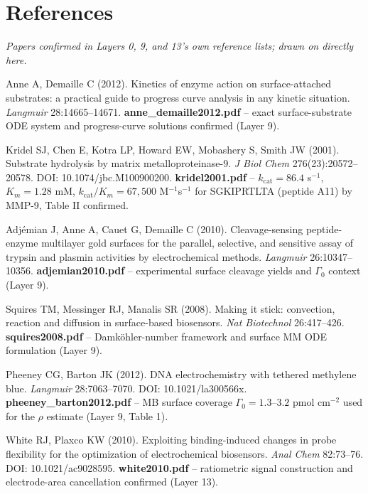 \documentclass[11pt]{article}
\numberwithin{equation}{section}
\begin{document}
\section*{References}
\textit{Papers confirmed in Layers 0, 9, and 13's own reference lists; drawn on directly here.}

\begin{enumerate}[leftmargin=2.2em, itemsep=6pt, label={[\arabic*]}]

\item Anne A, Demaille C (2012). Kinetics of enzyme action on surface-attached substrates: a practical guide
to progress curve analysis in any kinetic situation. \textit{Langmuir} 28:14665--14671.
\textbf{anne\_demaille2012.pdf} -- exact surface-substrate ODE system and progress-curve solutions confirmed
(Layer 9).

\item Kridel SJ, Chen E, Kotra LP, Howard EW, Mobashery S, Smith JW (2001). Substrate hydrolysis by matrix
metalloproteinase-9. \textit{J Biol Chem} 276(23):20572--20578. DOI: 10.1074/jbc.M100900200.
\textbf{kridel2001.pdf} -- $k_{\mathrm{cat}}=86.4$ s$^{-1}$, $K_m=1.28$ mM, $k_{\mathrm{cat}}/K_m=67{,}500$
M$^{-1}$s$^{-1}$ for SGKIPRTLTA (peptide A11) by MMP-9, Table II confirmed.

\item Adj\'emian J, Anne A, Cauet G, Demaille C (2010). Cleavage-sensing peptide-enzyme multilayer gold
surfaces for the parallel, selective, and sensitive assay of trypsin and plasmin activities by electrochemical
methods. \textit{Langmuir} 26:10347--10356. \textbf{adjemian2010.pdf} -- experimental surface cleavage yields
and $\Gamma_0$ context (Layer 9).

\item Squires TM, Messinger RJ, Manalis SR (2008). Making it stick: convection, reaction and diffusion in
surface-based biosensors. \textit{Nat Biotechnol} 26:417--426. \textbf{squires2008.pdf} -- Damk\"ohler-number
framework and surface MM ODE formulation (Layer 9).

\item Pheeney CG, Barton JK (2012). DNA electrochemistry with tethered methylene blue. \textit{Langmuir}
28:7063--7070. DOI: 10.1021/la300566x. \textbf{pheeney\_barton2012.pdf} -- MB surface coverage
$\Gamma_0=1.3$--$3.2$ pmol cm$^{-2}$ used for the $\rho$ estimate (Layer 9, Table 1).

\item White RJ, Plaxco KW (2010). Exploiting binding-induced changes in probe flexibility for the optimization
of electrochemical biosensors. \textit{Anal Chem} 82:73--76. DOI: 10.1021/ac9028595. \textbf{white2010.pdf} --
ratiometric signal construction and electrode-area cancellation confirmed (Layer 13).


\end{enumerate}
\end{document}
